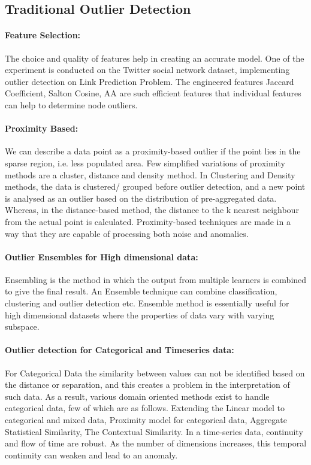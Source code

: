 \documentclass[runningheads]{llncs}
\begin{document}
\subsection{Traditional Outlier Detection}


\paragraph*{Feature Selection:} The choice and quality of features help in creating an accurate model. One of the experiment is conducted on the Twitter social network dataset, implementing outlier detection on Link Prediction Problem. The engineered features Jaccard Coefficient, Salton Cosine, AA are such efficient features that individual features can help to determine node outliers.
\paragraph*{Proximity Based:} We can describe a data point as a proximity-based outlier if the point lies in the sparse region, i.e. less populated area. Few simplified variations of proximity methods are a cluster, distance and density method. In Clustering and Density methods, the data is clustered/ grouped before outlier detection, and a new point is analysed as an outlier based on the distribution of pre-aggregated data. Whereas, in the distance-based method, the distance to the k nearest neighbour from the actual point is calculated. Proximity-based techniques are made in a way that they are capable of processing both noise and anomalies.
\paragraph*{Outlier Ensembles for High dimensional data:} Ensembling is the method in which the output from multiple learners is combined to give the final result. An Ensemble technique can combine classification, clustering and outlier detection etc. Ensemble method is essentially useful for high dimensional datasets where the properties of data vary with varying subspace.
\paragraph*{Outlier detection for Categorical and Timeseries data:} For Categorical Data the similarity between values can not be identified based on the distance or separation, and this creates a problem in the interpretation of such data. As a result, various domain oriented methods exist to handle categorical data, few of which are as follows. Extending the Linear model to categorical and mixed data, Proximity model for categorical data, Aggregate Statistical Similarity, The Contextual Similarity. In a time-series data, continuity and flow of time are robust. As the number of dimensions increases, this temporal continuity can weaken and lead to an anomaly.
\end{document}
